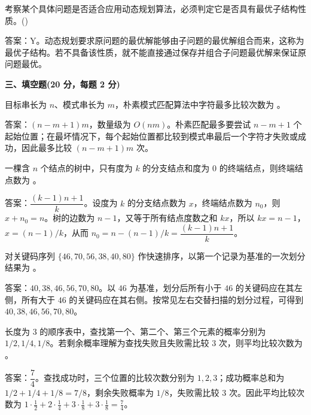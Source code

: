 \begin{question}
考察某个具体问题是否适合应用动态规划算法，必须判定它是否具有最优子结构性质。(\quad)
\begin{solution}
答案：Y。动态规划要求原问题的最优解能够由子问题的最优解组合而来，这称为最优子结构。若不具备该性质，就不能直接通过保存并组合子问题最优解来保证原问题最优。
\end{solution}
\end{question}

\textbf{三、填空题(20 分，每题 2 分)}

\begin{question}
目标串长为 $n$、模式串长为 $m$，朴素模式匹配算法中字符最多比较次数为 \blank。
\begin{solution}
答案：$(n-m+1)m$，数量级为 $O(nm)$。朴素匹配最多要尝试 $n-m+1$ 个起始位置；在最坏情况下，每个起始位置都比较到模式串最后一个字符才失败或成功，因此最多比较 $(n-m+1)m$ 次。
\end{solution}
\end{question}

\begin{question}
一棵含 $n$ 个结点的树中，只有度为 $k$ 的分支结点和度为 $0$ 的终端结点，则终端结点数为 \blank。
\begin{solution}
答案：$\dfrac{(k-1)n+1}{k}$。设度为 $k$ 的分支结点数为 $x$，终端结点数为 $n_0$，则 $x+n_0=n$。树的边数为 $n-1$，又等于所有结点度数之和 $kx$，所以 $kx=n-1$，$x=(n-1)/k$，从而 $n_0=n-(n-1)/k=\dfrac{(k-1)n+1}{k}$。
\end{solution}
\end{question}

\begin{question}
对关键码序列 $\{46,70,56,38,40,80\}$ 作快速排序，以第一个记录为基准的一次划分结果为 \blank。
\begin{solution}
答案：$40,38,46,56,70,80$。以 $46$ 为基准，划分后所有小于 $46$ 的关键码应在其左侧，所有大于 $46$ 的关键码应在其右侧。按常见左右交替扫描的划分过程，可得到 $40,38,46,56,70,80$。
\end{solution}
\end{question}

\begin{question}
长度为 $3$ 的顺序表中，查找第一个、第二个、第三个元素的概率分别为 $1/2,1/4,1/8$。若剩余概率理解为查找失败且失败需比较 $3$ 次，则平均比较次数为 \blank。
\begin{solution}
答案：$\dfrac{7}{4}$。查找成功时，三个位置的比较次数分别为 $1,2,3$；成功概率总和为 $1/2+1/4+1/8=7/8$，剩余失败概率为 $1/8$，失败需比较 $3$ 次。因此平均比较次数为 $1\cdot\frac12+2\cdot\frac14+3\cdot\frac18+3\cdot\frac18=\frac74$。
\end{solution}
\end{question}

